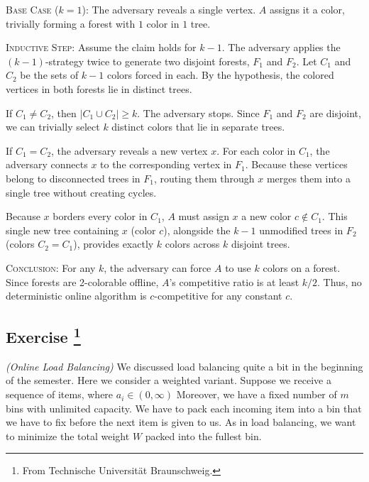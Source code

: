 \documentclass[14pt]{extreport}
\newcounter{counter}
\newcommand{\Exercise}{Exercise \stepcounter{counter}\thecounter}
\begin{document}
    \vspace{3mm}
    \textsc{Base Case} ($k=1$): The adversary reveals a single vertex. $A$ assigns it a color, trivially forming a forest with $1$ color in $1$ tree.

    \vspace{3mm}
    \textsc{Inductive Step}: Assume the claim holds for $k-1$. The adversary applies the $(k-1)$-strategy twice to generate two disjoint forests, $F_1$ and $F_2$. Let $C_1$ and $C_2$ be the sets of $k-1$ colors forced in each. By the hypothesis, the colored vertices in both forests lie in distinct trees.

    \vspace{2mm}
    If $C_1 \neq C_2$, then $|C_1 \cup C_2| \geq k$. The adversary stops. Since $F_1$ and $F_2$ are disjoint, we can trivially select $k$ distinct colors that lie in separate trees.

    \vspace{2mm}
    If $C_1 = C_2$, the adversary reveals a new vertex $x$. For each color in $C_1$, the adversary connects $x$ to the corresponding vertex in $F_1$. Because these vertices belong to disconnected trees in $F_1$, routing them through $x$ merges them into a single tree without creating cycles. 

    \vspace{2mm}
    Because $x$ borders every color in $C_1$, $A$ must assign $x$ a new color $c \notin C_1$. This single new tree containing $x$ (color $c$), alongside the $k-1$ unmodified trees in $F_2$ (colors $C_2 = C_1$), provides exactly $k$ colors across $k$ disjoint trees.

    \vspace{3mm}
    \textsc{Conclusion}: For any $k$, the adversary can force $A$ to use $k$ colors on a forest. Since forests are 2-colorable offline, $A$'s competitive ratio is at least $k/2$. Thus, no deterministic online algorithm is $c$-competitive for any constant $c$.

\subsection*{\Exercise\footnote{From Technische Universität Braunschweig.}}
    \textit{(Online Load Balancing)} We discussed load balancing quite a bit in the beginning of the semester. Here we consider a weighted variant. Suppose we receive a sequence of items, where $a_{i} \in (0, \infty)$ Moreover, we have a fixed number of $m$ bins with unlimited capacity. We have to pack each incoming item into a bin that we have to fix before the next item is given to us. As in load balancing, we want to minimize the total weight $W$ packed into the fullest bin.
\end{document}

